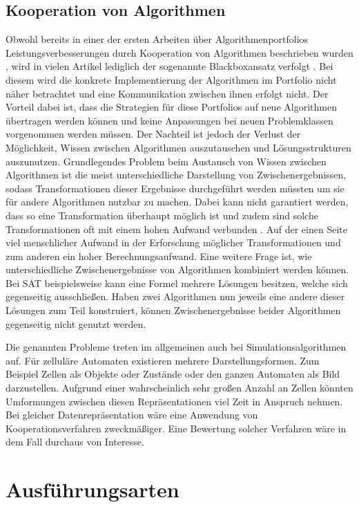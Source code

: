 \subsection{Kooperation von Algorithmen}

Obwohl bereits in einer der ersten Arbeiten über Algorithmenportfolios Leistungsverbesserungen durch Kooperation von Algorithmen beschrieben wurden \cite{huberman97}, wird in vielen Artikel lediglich der sogenannte Blackboxansatz verfolgt \cite{gaglioloschmidhuber06, fukunaga99, gomesselman97}. Bei diesem wird die konkrete Implementierung der Algorithmen im Portfolio nicht näher betrachtet und eine Kommunikation zwischen ihnen erfolgt nicht. Der Vorteil dabei ist, dass die Strategien für diese Portfolios auf neue Algorithmen übertragen werden können und keine Anpassungen bei neuen Problemklassen vorgenommen werden müssen. Der Nachteil ist jedoch der Verlust der Möglichkeit, Wissen zwischen Algorithmen auszutauschen und Lösungsstrukturen auszunutzen. Grundlegendes Problem beim Austausch von Wissen zwischen Algorithmen ist die meist unterschiedliche Darstellung von Zwischenergebnissen, sodass Transformationen dieser Ergebnisse durchgeführt werden müssten um sie für andere Algorithmen nutzbar zu machen. Dabei kann nicht garantiert werden, dass so eine Transformation überhaupt möglich ist und zudem sind solche Transformationen oft mit einem hohen Aufwand verbunden \cite{roberts06}. Auf der einen Seite viel menschlicher Aufwand in der Erforschung möglicher Transformationen und zum anderen ein hoher Berechnungsaufwand. Eine weitere Frage ist, wie unterschiedliche Zwischenergebnisse von Algorithmen kombiniert werden können. Bei SAT beispielsweise kann eine Formel mehrere Lösungen besitzen, welche sich gegenseitig ausschließen. Haben zwei Algorithmen nun jeweils eine andere dieser Lösungen zum Teil konstruiert, können Zwischenergebnisse beider Algorithmen gegenseitig nicht genutzt werden.

Die genannten Probleme treten im allgemeinen auch bei Simulationsalgorithmen auf. Für zelluläre Automaten existieren mehrere Darstellungsformen. Zum Beispiel Zellen als Objekte oder Zustände oder den ganzen Automaten als Bild darzustellen. Aufgrund einer wahrscheinlich sehr großen Anzahl an Zellen könnten Umformungen zwischen diesen Repräsentationen viel Zeit in Anspruch nehmen. Bei gleicher Datenrepräsentation wäre eine Anwendung von Kooperationsverfahren zweckmäßiger. Eine Bewertung solcher Verfahren wäre in dem Fall durchaus von Interesse.

\section{Ausführungsarten}

